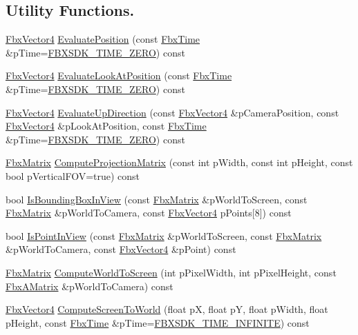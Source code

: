 \subsection*{Utility Functions.}
\begin{DoxyCompactItemize}
\item 
\hyperlink{class_fbx_vector4}{Fbx\+Vector4} \hyperlink{class_fbx_camera_ae52c55ed3e2bc5ba64d37e103155dcad}{Evaluate\+Position} (const \hyperlink{class_fbx_time}{Fbx\+Time} \&p\+Time=\hyperlink{fbxtime_8h_aa43cd11e74102affeac06402663d2653}{F\+B\+X\+S\+D\+K\+\_\+\+T\+I\+M\+E\+\_\+\+Z\+E\+RO}) const
\item 
\hyperlink{class_fbx_vector4}{Fbx\+Vector4} \hyperlink{class_fbx_camera_ab165ef1a4608be94263afed2d2a61d77}{Evaluate\+Look\+At\+Position} (const \hyperlink{class_fbx_time}{Fbx\+Time} \&p\+Time=\hyperlink{fbxtime_8h_aa43cd11e74102affeac06402663d2653}{F\+B\+X\+S\+D\+K\+\_\+\+T\+I\+M\+E\+\_\+\+Z\+E\+RO}) const
\item 
\hyperlink{class_fbx_vector4}{Fbx\+Vector4} \hyperlink{class_fbx_camera_a8ef4db785dca64209e09450a13dfe368}{Evaluate\+Up\+Direction} (const \hyperlink{class_fbx_vector4}{Fbx\+Vector4} \&p\+Camera\+Position, const \hyperlink{class_fbx_vector4}{Fbx\+Vector4} \&p\+Look\+At\+Position, const \hyperlink{class_fbx_time}{Fbx\+Time} \&p\+Time=\hyperlink{fbxtime_8h_aa43cd11e74102affeac06402663d2653}{F\+B\+X\+S\+D\+K\+\_\+\+T\+I\+M\+E\+\_\+\+Z\+E\+RO}) const
\item 
\hyperlink{class_fbx_matrix}{Fbx\+Matrix} \hyperlink{class_fbx_camera_a1d591f5fa59e93139cc1901b3ab92d21}{Compute\+Projection\+Matrix} (const int p\+Width, const int p\+Height, const bool p\+Vertical\+F\+OV=true) const
\item 
bool \hyperlink{class_fbx_camera_a19568019c2c2be2188688ad1c059a9b7}{Is\+Bounding\+Box\+In\+View} (const \hyperlink{class_fbx_matrix}{Fbx\+Matrix} \&p\+World\+To\+Screen, const \hyperlink{class_fbx_matrix}{Fbx\+Matrix} \&p\+World\+To\+Camera, const \hyperlink{class_fbx_vector4}{Fbx\+Vector4} p\+Points\mbox{[}8\mbox{]}) const
\item 
bool \hyperlink{class_fbx_camera_a95d54985eb3b83e3a578723a7493fb6c}{Is\+Point\+In\+View} (const \hyperlink{class_fbx_matrix}{Fbx\+Matrix} \&p\+World\+To\+Screen, const \hyperlink{class_fbx_matrix}{Fbx\+Matrix} \&p\+World\+To\+Camera, const \hyperlink{class_fbx_vector4}{Fbx\+Vector4} \&p\+Point) const
\item 
\hyperlink{class_fbx_matrix}{Fbx\+Matrix} \hyperlink{class_fbx_camera_a7ca9c615202fdb7224bfbe7be39ee5da}{Compute\+World\+To\+Screen} (int p\+Pixel\+Width, int p\+Pixel\+Height, const \hyperlink{class_fbx_a_matrix}{Fbx\+A\+Matrix} \&p\+World\+To\+Camera) const
\item 
\hyperlink{class_fbx_vector4}{Fbx\+Vector4} \hyperlink{class_fbx_camera_aad32eaba1bbe6dd078cb1a6c7ee6aa45}{Compute\+Screen\+To\+World} (float pX, float pY, float p\+Width, float p\+Height, const \hyperlink{class_fbx_time}{Fbx\+Time} \&p\+Time=\hyperlink{fbxtime_8h_a1e6db3fe0f84f0b7daa775739f93526f}{F\+B\+X\+S\+D\+K\+\_\+\+T\+I\+M\+E\+\_\+\+I\+N\+F\+I\+N\+I\+TE}) const
\end{DoxyCompactItemize}
